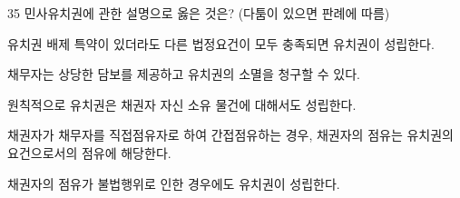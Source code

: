 \begin{question}{35}
민사유치권에 관한 설명으로 옳은 것은? (다툼이 있으면 판례에 따름)
\begin{choices}
  \item 유치권 배제 특약이 있더라도 다른 법정요건이 모두 충족되면 유치권이 성립한다.
  \item 채무자는 상당한 담보를 제공하고 유치권의 소멸을 청구할 수 있다.
  \item 원칙적으로 유치권은 채권자 자신 소유 물건에 대해서도 성립한다.
  \item 채권자가 채무자를 직접점유자로 하여 간접점유하는 경우, 채권자의 점유는 유치권의 요건으로서의 점유에 해당한다.
  \item 채권자의 점유가 불법행위로 인한 경우에도 유치권이 성립한다.
\end{choices}
\end{question}
